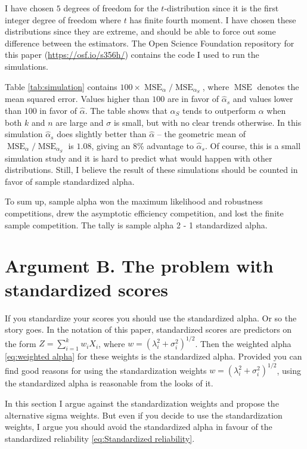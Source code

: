 \documentclass[twoside]{article}
\DeclareMathOperator{\MSE}{MSE}
\DeclareMathOperator{\tsum}{\textstyle \sum}
\begin{document}
I have chosen $5$ degrees of freedom for the $t$-distribution since it is the first integer degree of freedom where $t$ has finite fourth moment. %
I have chosen these distributions since they are extreme, and should be able to force out some difference between the estimators. The Open Science Foundation repository for this paper (\url{https://osf.io/s356h/}) contains the code I used to run the simulations.

Table \ref{tab:simulation} contains $100 \times \MSE_\alpha/\MSE_{\alpha_S}$, where $\MSE$ denotes the mean squared error. Values higher than $100$ are in favor of $\hat{\alpha}_s$ and values lower than $100$ in favor of $\hat{\alpha}$. The table shows that $\alpha_S$ tends to outperform $\alpha$ when both $k$ and $n$ are large and $\sigma$ is small, but with no clear trends otherwise. In this simulation $\hat{\alpha}_s$ does slightly better than $\hat{\alpha}$ -- the geometric mean of $\MSE_\alpha/\MSE_{\alpha_S}$ is $1.08$, giving an $8$\% advantage to $\hat{\alpha}_s$. Of course, this is a small simulation study and it is hard to predict what would happen with other distributions. Still, I believe the result of these simulations should be counted in favor of sample standardized alpha.

To sum up, sample alpha won the maximum likelihood and robustness competitions, drew the asymptotic efficiency competition, and lost the finite sample competition. The tally is sample alpha 2 - 1 standardized alpha. 



\section{Argument B. The problem with standardized scores}
\label{sec:argument B}
If you standardize your scores you should use the standardized alpha. Or so the story goes. In the notation of this paper, standardized scores are predictors on the form $\hat{Z} = \tsum_{i=1}^k w_iX_i$, where $w=(\lambda_i^2 + \sigma_i^2)^{1/2}$. Then the weighted alpha \eqref{eq:weighted alpha} for these weights is the standardized alpha. Provided you can find good reasons for using the standardization weights $w=(\lambda_i^2 + \sigma_i^2)^{1/2}$, using the standardized alpha is reasonable from the looks of it.

In this section I argue against the standardization weights and propose the alternative sigma weights. But even if you decide to use the standardization weights, I argue you should avoid the standardized alpha in favour of the standardized reliability \eqref{eq:Standardized reliability}. 
\end{document}
